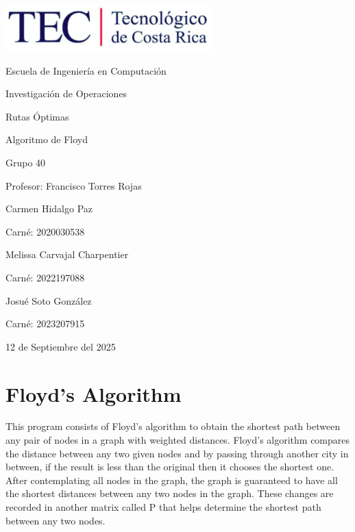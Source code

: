 \documentclass{article}
\begin{document}
\begin{titlepage}
    \centering
    \includegraphics[width=0.6\textwidth]{logo-tec.png}\par\vspace{1cm}

    {\large Escuela de Ingeniería en Computación\par}
    {\large Investigación de Operaciones\par}
    \vspace{2cm}

    {\Large Rutas Óptimas\par}
    {\large Algoritmo de Floyd\par}
    \vspace{2cm}

    {\large Grupo 40\par}
    {\large Profesor: Francisco Torres Rojas\par}
    \vspace{3cm}

    {\large Carmen Hidalgo Paz\par}
    {\large Carné: 2020030538\par}
    \vspace{1cm}
    {\large Melissa Carvajal Charpentier\par}
    {\large Carné: 2022197088\par}
    \vspace{1cm}
    {\large Josué Soto González\par}
    {\large Carné: 2023207915\par}
    \vspace{1cm}

    {\large 12 de Septiembre del 2025\par}
\end{titlepage}

\newpage


\section{Floyd's Algorithm}
This program consists of Floyd's algorithm to obtain the shortest path between any pair of nodes in a graph with weighted distances.
Floyd's algorithm compares the distance between any two given nodes and by passing through another city in between, if the result is less than the original then it chooses the shortest one. After contemplating all nodes in the graph, the graph is guaranteed to have all the shortest distances between any two nodes in the graph. These changes are recorded in another matrix called P that helps determine the shortest path between any two nodes.
\end{document}

